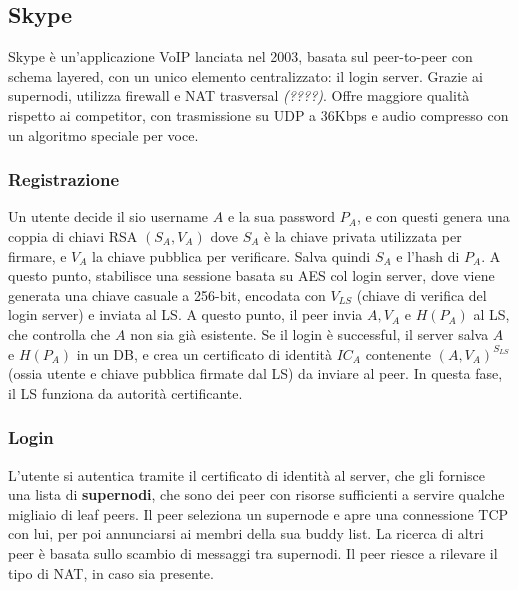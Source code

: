 \documentclass[11pt]{article}
\begin{document}
\subsection{Skype} Skype è un'applicazione VoIP lanciata nel 2003, basata sul peer-to-peer con schema layered, con un unico elemento centralizzato: il login server. Grazie ai supernodi, utilizza firewall e NAT trasversal \textit{(????)}. Offre maggiore qualità rispetto ai competitor, con trasmissione su UDP a 36Kbps e audio compresso con un algoritmo speciale per voce. 
\subsubsection{Registrazione}
Un utente decide il sio username $A$ e la sua password $P_A$, e con questi genera una coppia di chiavi RSA $(S_A, V_A)$ dove $S_A$ è la chiave privata utilizzata per firmare, e $V_A$ la chiave pubblica per verificare. Salva quindi $S_A$ e l'hash di $P_A$. A questo punto, stabilisce una sessione basata su AES col login server, dove viene generata una chiave casuale a 256-bit, encodata con $V_{LS}$ (chiave di verifica del login server) e inviata al LS.
A questo punto, il peer invia $A, V_A$ e $H(P_A)$ al LS, che controlla che $A$ non sia già esistente. Se il login è successful, il server salva $A$ e $H(P_A)$ in un DB, e crea un certificato di identità $IC_A$ contenente $(A,V_A)^{S_{LS}}$ (ossia utente e chiave pubblica firmate dal LS) da inviare al peer. In questa fase, il LS funziona da autorità certificante. 
\subsubsection{Login} L'utente si autentica tramite il certificato di identità al server, che gli fornisce una lista di \textbf{supernodi}, che sono dei peer con risorse sufficienti a servire qualche migliaio di leaf peers. Il peer seleziona un supernode e apre una connessione TCP con lui, per poi annunciarsi ai membri della sua buddy list. La ricerca di altri peer è basata sullo scambio di messaggi tra supernodi. Il peer riesce a rilevare il tipo di NAT, in caso sia presente. 
\end{document}
